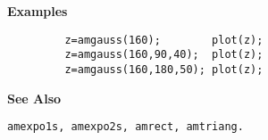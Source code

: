 {\bf \large \sf Examples}
\begin{verbatim}
         z=amgauss(160);        plot(z);
         z=amgauss(160,90,40);  plot(z);
         z=amgauss(160,180,50); plot(z);
\end{verbatim}
\vspace*{.5cm}


{\bf \large \sf See Also}\\
\hspace*{1.5cm}
\begin{minipage}[t]{13.5cm}
\begin{verbatim}
amexpo1s, amexpo2s, amrect, amtriang.
\end{verbatim}
\end{minipage}

